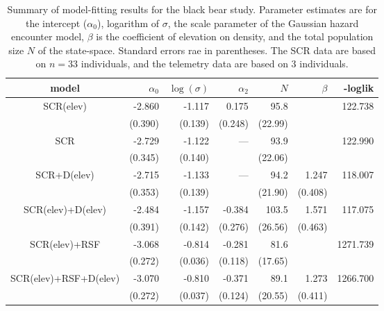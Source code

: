 \begin{table}
\centering
\caption{
Summary of model-fitting results for the black bear study. Parameter
estimates are for the intercept ($\alpha_{0}$), logarithm of $\sigma$,
the
scale parameter of the Gaussian hazard encounter model, 
 $\beta$ is the coefficient of elevation on density, and the total
 population size $N$ of the state-space. Standard errors
 rae in parentheses.
The SCR data are based on $n=33$ individuals, and the telemetry data
are based on 3 individuals. 
}
\begin{tabular}{c|rrrrrr}
\hline \hline
model         & $\alpha_0$ & $\log(\sigma)$ & $\alpha_{2}$ & $N$ & 
$\beta$       & -loglik                                                                         \\ \hline
SCR(elev)      & -2.860    & -1.117        & 0.175       & 95.8        &        & 122.738  \\
             &  (0.390)     & (0.139)       & (0.248)       & (22.99)        &        &           \\
SCR          & -2.729    & -1.122        & ---          & 93.9        &        & 122.990  \\
              & (0.345)     & (0.140)       &              & (22.06)        &        &           \\
SCR+D(elev)      & -2.715    & -1.133        & ---          & 94.2        & 1.247 & 118.007  \\
              & (0.353)     & (0.139)       &              & (21.90)    & (0.408) &           \\
SCR(elev)+D(elev) & -2.484    & -1.157        & -0.384      & 103.5        & 1.571 & 117.075  \\
              & (0.391)     & (0.142)       & (0.276)       & (26.56)   & (0.463) &           \\
SCR(elev)+RSF       & -3.068    & -0.814        & -0.281      & 81.6        &        & 1271.739 \\
              & (0.272)    & (0.036)         & (0.118)       & (17.65)        &        &           \\
SCR(elev)+RSF+D(elev)  & -3.070    & -0.810        & -0.371      & 89.1        & 1.273 & 1266.700 \\
              & (0.272)    & (0.037)         & (0.124)       & (20.55)        & (0.411) &           \\
\hline
\end{tabular}
\label{tab.nyresults}
\end{table}



